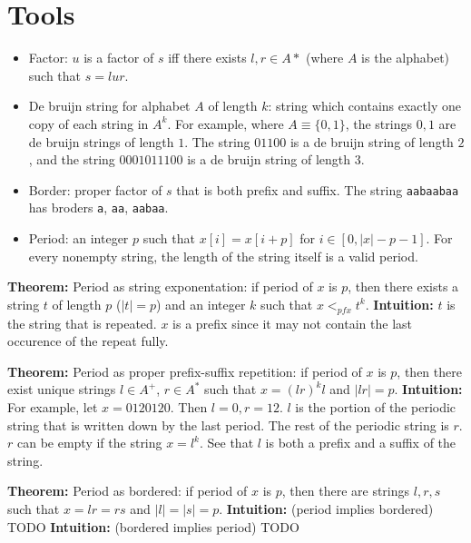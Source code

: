 \documentclass{report}
\newcommand*{\theorem}{\leavevmode\newline \textbf{Theorem: } }
\newcommand*{\intuition}{\leavevmode\newline \textbf{Intuition: } }
\newcommand{\pref}{<_{pfx}}
\begin{document}
\chapter{Tools}
\begin{itemize}
        \item Factor: $u$ is a factor of $s$ iff there exists $l, r \in A*$ (where $A$ is the alphabet)
               such that $s = lur$.
        \item De bruijn string for alphabet $A$ of length $k$: string which contains exactly one copy of each string in $A^k$.
              For example, where $A \equiv \{0, 1\}$, the strings $0, 1$ are de bruijn strings of length $1$. The string
              $01100$ is a de bruijn string of length $2$, and the string $0001011100$ is a de bruijn string of length $3$.
        \item Border: proper factor of $s$ that is both prefix and suffix. The string \texttt{aabaabaa} has broders
            \texttt{a}, \texttt{aa}, \texttt{aabaa}.
        \item Period: an integer $p$ such that $x[i] = x[i+p]$ for $i \in [0, |x|-p-1]$. For every nonempty string,
              the length of the string itself is a valid period.
\end{itemize}

\theorem Period as string exponentation: if period of $x$ is $p$, then there exists a string $t$ of length $p$ ($|t| = p$)
   and an integer $k$ such that $x \pref t^k$.
\intuition $t$ is the string that is repeated. $x$ is a prefix since it may not contain the last occurence of 
  the repeat fully.

\theorem Period as proper prefix-suffix repetition: if period of $x$ is $p$, then there exist unique strings $l \in A^+$, $r \in A^*$
  such that $x = (lr)^kl$ and $|lr| = p$.
\intuition For example, let $x = 0120120$. Then $l=0, r=12$. 
   $l$ is the portion of the periodic string that is written down by the last period. The rest of the periodic string
  is $r$. $r$ can be empty if the string $x = l^k$.  See that $l$ is both a prefix and a suffix of the string.

\theorem Period as bordered: if period of $x$ is $p$, then there are strings $l, r, s$ such that $x = lr = rs$ and $|l|=|s|=p$.
\intuition (period implies bordered) TODO
\intuition (bordered implies period) TODO
\end{document}
